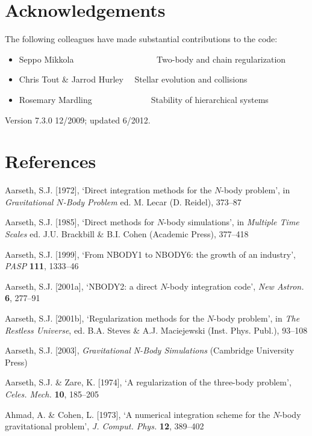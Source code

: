 \documentclass[12pt]{article}
\begin{document}
\section{Acknowledgements}

The following colleagues have made substantial contributions to the code:

\begin{itemize}

\item Seppo Mikkola ~~~~~~~~~~~~~~~~~~~Two-body and chain regularization
\item Chris Tout \& Jarrod Hurley ~~Stellar evolution and collisions
\item Rosemary Mardling~~~~~~~~~~~~~~Stability of hierarchical systems
\end{itemize}

\bigskip
Version 7.3.0 12/2009; updated 6/2012.

\newpage
\section*{References}

\medskip
\noindent
Aarseth, S.J. [1972], `Direct integration methods for the $N$-body problem',
in {\it Gravitational $N$-Body Problem} ed. M. Lecar (D. Reidel), 373--87

\medskip
\noindent
Aarseth, S.J. [1985], `Direct methods for $N$-body simulations',
in {\it Multiple Time Scales} ed. J.U. Brackbill \& B.I. Cohen
(Academic Press), 377--418

\medskip
\noindent
Aarseth, S.J. [1999], `From NBODY1 to NBODY6: the growth of an industry',
{\it PASP} {\bf 111}, 1333--46

\medskip
\noindent
Aarseth, S.J. [2001a], `NBODY2: a direct $N$-body integration code',
{\it New Astron.} {\bf 6}, 277--91

\medskip
\noindent
Aarseth, S.J. [2001b], `Regularization methods for the $N$-body problem',
in {\it The Restless Universe}, ed. B.A. Steves \& A.J. Maciejewski
(Inst. Phys. Publ.), 93--108

\medskip
\noindent
Aarseth, S.J. [2003], {\it Gravitational N-Body Simulations} (Cambridge University Press)

\medskip
\noindent
Aarseth, S.J. \& Zare, K. [1974], `A regularization of the three-body problem',
{\it Celes. Mech.} {\bf 10}, 185--205

\medskip
\noindent
Ahmad, A. \& Cohen, L. [1973], `A numerical integration scheme for the $N$-body
gravitational problem', {\it J. Comput. Phys.} {\bf 12}, 389--402
\end{document}
